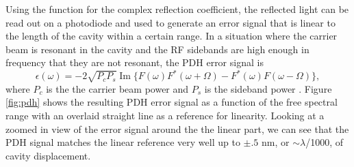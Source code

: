 Using the function for the complex reflection coefficient, the reflected light 
can be read out on a photodiode and used to generate an 
error signal that is linear to the length of the cavity within a certain range. 
In a situation where the carrier beam is resonant in the cavity and the RF 
sidebands are high enough in frequency that they are not resonant, the PDH error 
signal is
\begin{equation}
\epsilon(\omega) = -2\sqrt{P_{c}P_{s}}\operatorname{Im}\{F(\omega)F^*(\omega + \Omega) - F^*(\omega)F(\omega - \Omega)\},
\end{equation}
where $P_{c}$ is the the carrier beam power and $P_{s}$ is the sideband power 
\cite{Black01}.
Figure \ref{fig:pdh} shows the resulting PDH error signal as a function of 
the free spectral range with an overlaid straight line as a reference for 
linearity. Looking at a zoomed in view of the error signal around the the linear 
part, we can see that the PDH signal matches the linear reference very well 
up to $\pm.5$ nm, or $\sim\lambda$/1000, of cavity displacement. 

